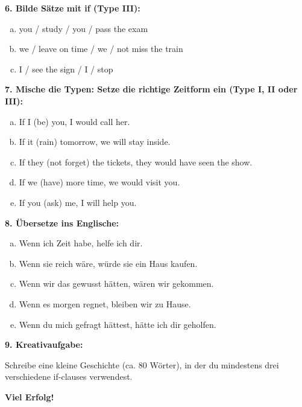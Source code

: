 \textbf{6. Bilde Sätze mit if (Type III):}
\begin{enumerate}[a)]
    \item you / study / you / pass the exam
    \item we / leave on time / we / not miss the train
    \item I / see the sign / I / stop
\end{enumerate}

\vspace{0.5em}

\textbf{7. Mische die Typen: Setze die richtige Zeitform ein (Type I, II oder III):}
\begin{enumerate}[a)]
    \item If I \underline{\hspace{2cm}} (be) you, I would call her.
    \item If it \underline{\hspace{2cm}} (rain) tomorrow, we will stay inside.
    \item If they \underline{\hspace{2cm}} (not forget) the tickets, they would have seen the show.
    \item If we \underline{\hspace{2cm}} (have) more time, we would visit you.
    \item If you \underline{\hspace{2cm}} (ask) me, I will help you.
\end{enumerate}

\vspace{0.5em}

\textbf{8. Übersetze ins Englische:}
\begin{enumerate}[a)]
    \item Wenn ich Zeit habe, helfe ich dir.
    \item Wenn sie reich wäre, würde sie ein Haus kaufen.
    \item Wenn wir das gewusst hätten, wären wir gekommen.
    \item Wenn es morgen regnet, bleiben wir zu Hause.
    \item Wenn du mich gefragt hättest, hätte ich dir geholfen.
\end{enumerate}

\vspace{0.5em}

\textbf{9. Kreativaufgabe:}

Schreibe eine kleine Geschichte (ca. 80 Wörter), in der du mindestens drei verschiedene if-clauses verwendest.

\textbf{Viel Erfolg!}